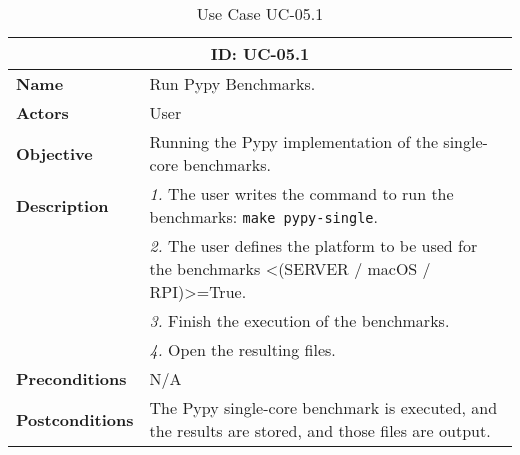 \begin{table}[H]
    \centering
    \begin{tabular}{l p{10cm}}
        \toprule
        \multicolumn{2}{c}{\textbf{ID: UC-05.1}} \\
        \toprule
        \textbf{Name}                         &  Run Pypy Benchmarks. \\
        \textbf{Actors}                       &  User \\
        \textbf{Objective}                    &  Running the Pypy implementation of the single-core benchmarks. \\
        \multirow{1}{*}{\textbf{Description}} & \textsl{1.} The user writes the command to run the benchmarks: \texttt{make pypy-single}.\\
                                              & \textsl{2.} The user defines the platform to be used for the benchmarks <(SERVER / macOS / RPI)>=True.\\
                                              & \textsl{3.} Finish the execution of the benchmarks.\\
                                              & \textsl{4.} Open the resulting files.\\ 
        \textbf{Preconditions}                &  N/A \\
        \textbf{Postconditions}               &  The Pypy single-core benchmark is executed, and the results are stored, and those files are output. \\
    \end{tabular}
    \caption{Use Case UC-05.1}
    \label{tab:uc-05.1}
\end{table}

